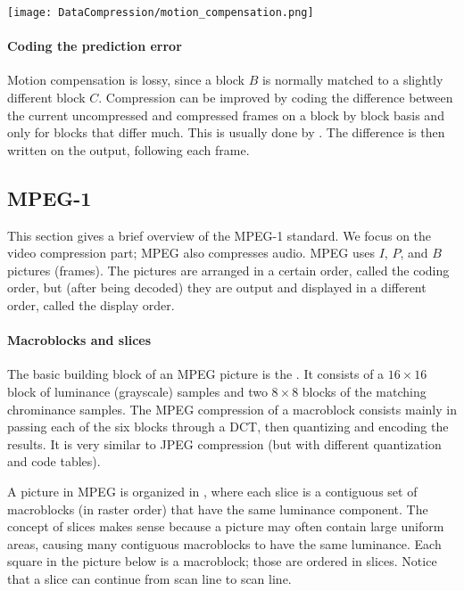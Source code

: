 \documentclass[a4paper, 11pt, openany]{book}
\begin{document}
\begin{center}
    \texttt{[image: DataCompression/motion\_compensation.png]}
\end{center}



\paragraph{Coding  the prediction error}
Motion compensation is lossy, since a block $B$ is normally matched to a slightly different block $C$. Compression can be improved by coding the difference between the current uncompressed and compressed frames on a block by block basis and only for blocks that differ much. This is usually done by . The difference is then written on the output, following each frame.




\subsection{MPEG-1}

This section gives a brief overview of the MPEG-1 standard. We focus on the video compression part; MPEG also compresses audio. MPEG uses $I$, $P$, and $B$ pictures (frames). The pictures are arranged in a certain order, called the coding order, but (after being decoded) they are output and displayed in a different order, called the display order.

\paragraph{Macroblocks and slices}
The basic building block of an MPEG picture is the . It
consists of a $16 \times 16$ block of luminance (grayscale) samples and two $8 \times 8$ blocks of the matching chrominance samples. The MPEG compression of a macroblock consists mainly in passing each of the six blocks through a DCT, then quantizing and encoding the results. It is very similar to JPEG compression (but with different quantization and code tables).

A picture in MPEG is organized in , where each slice is a contiguous set of
macroblocks (in raster order) that have the same luminance component. The concept of slices makes sense because a picture may often contain large uniform areas, causing many contiguous macroblocks to have the same luminance. Each square in the picture below is a macroblock; those are ordered in slices. Notice that a slice can continue from scan line to scan line.
\end{document}
